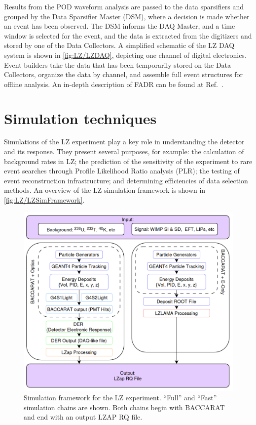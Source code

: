 Results from the POD waveform analysis are passed to the data sparsifiers and grouped by the Data Sparsifier Master (DSM), where a decision is made whether an event has been observed. The DSM informs the DAQ Master, and a time window is selected for the event, and the data is extracted from the digitizers and stored by one of the Data Collectors. A simplified schematic of the LZ DAQ system is shown in \ref{fig:LZ/LZDAQ}, depicting one channel of digital electronics. Event builders take the data that has been temporarily stored on the Data Collectors, organize the data by channel, and assemble full event structures for offline analysis. An in-depth description of FADR can be found at Ref.~\cite{LZ:2024bvw}. 
\section{Simulation techniques}\label{sec:LZ/Simulations}
Simulations of the LZ experiment play a key role in understanding the detector and its response. They present several purposes, for example: the calculation of background rates in LZ; the prediction of the sensitivity of the experiment to rare event searches through Profile Likelihood Ratio analysis (PLR); the testing of event reconstruction infrastructure; and determining efficiencies of data selection methods. An overview of the LZ simulation framework is shown in \autoref{fig:LZ/LZSimFramework}.
\begin{figure}[!ht]
    \centering
    \includegraphics[width=0.95\linewidth]{figures/LZ/LZSimFramework.png}
    \caption[Simulation framework for the LZ experiment.]{Simulation framework for the LZ experiment. ``Full'' and ``Fast'' simulation chains are shown. Both chains begin with BACCARAT and end with an output LZAP RQ file.}
    \label{fig:LZ/LZSimFramework}
\end{figure}
